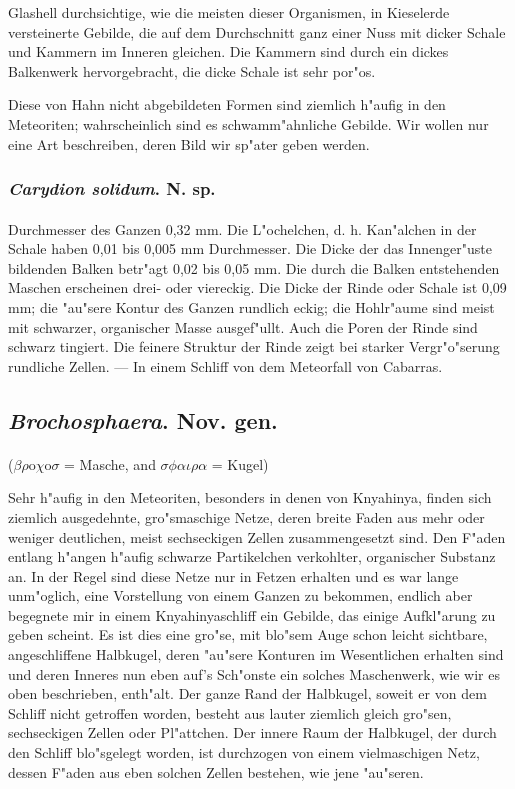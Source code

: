 \documentclass[a4paper, 11pt, oneside]{article}
\begin{document}
Glashell durchsichtige, wie die meisten dieser Organismen, in Kieselerde versteinerte Gebilde, die auf dem Durchschnitt ganz einer Nuss mit dicker Schale und Kammern im Inneren gleichen. Die Kammern sind durch ein dickes Balkenwerk hervorgebracht, die dicke Schale ist sehr por"os.

Diese von Hahn nicht abgebildeten Formen sind ziemlich h"aufig in den Meteoriten; wahrscheinlich sind es schwamm"ahnliche Gebilde. Wir wollen nur eine Art beschreiben, deren Bild wir sp"ater geben werden.
\subsubsection{\emph{Carydion solidum}. N. sp.}
\paragraph{}
Durchmesser des Ganzen 0,32 mm. Die L"ochelchen, d. h. Kan"alchen in der Schale haben 0,01 bis 0,005 mm Durchmesser. Die Dicke der das Innenger"uste bildenden Balken betr"agt 0,02 bis 0,05 mm. Die durch die Balken entstehenden Maschen erscheinen drei- oder viereckig. Die Dicke der Rinde oder Schale ist 0,09 mm; die "au"sere Kontur des Ganzen rundlich eckig; die Hohlr"aume sind meist mit schwarzer, organischer Masse ausgef"ullt. Auch die Poren der Rinde sind schwarz tingiert. Die feinere Struktur der Rinde zeigt bei starker Vergr"o"serung rundliche Zellen. --- In einem Schliff von dem Meteorfall von Cabarras.
\subsection{\emph{Brochosphaera}. Nov. gen.}
\paragraph{}
($\beta\rho$o$\chi$o$\sigma$ = Masche, and $\sigma\phi\alpha\iota\rho\alpha$ = Kugel)%

Sehr h"aufig in den Meteoriten, besonders in denen von Knyahinya, finden sich ziemlich ausgedehnte, gro"smaschige Netze, deren breite Faden aus mehr oder weniger deutlichen, meist sechseckigen Zellen zusammengesetzt sind. Den F"aden entlang h"angen h"aufig schwarze Partikelchen verkohlter, organischer Substanz an. In der Regel sind diese Netze nur in Fetzen erhalten und es war lange unm"oglich, eine Vorstellung von einem Ganzen zu bekommen, endlich aber begegnete mir in einem Knyahinyaschliff ein Gebilde, das einige Aufkl"arung zu geben scheint. Es ist dies eine gro"se, mit blo"sem Auge schon leicht sichtbare, angeschliffene Halbkugel, deren "au"sere Konturen im Wesentlichen erhalten sind und deren Inneres nun eben auf's Sch"onste ein solches Maschenwerk, wie wir es oben beschrieben, enth"alt. Der ganze Rand der Halbkugel, soweit er von dem Schliff nicht getroffen worden, besteht aus lauter ziemlich gleich gro"sen, sechseckigen Zellen oder Pl"attchen. Der innere Raum der Halbkugel, der durch den Schliff blo"sgelegt worden, ist durchzogen von einem vielmaschigen Netz, dessen F"aden aus eben solchen Zellen bestehen, wie jene "au"seren.
\end{document}
